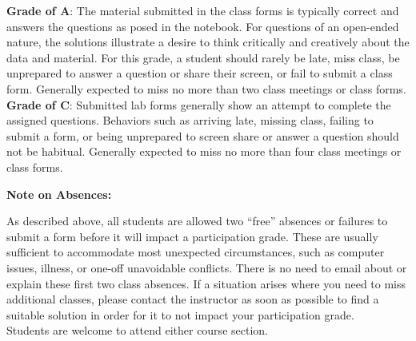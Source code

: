 \documentclass[12pt, a4paper]{article}
\makeatletter
\newcommand{\magenta}[1]{\textcolor{solarized@magenta}{#1}}
\makeatother
\begin{document}
\setlength{\leftskip}{1cm}

\textbf{Grade of \magenta{A}}: The material submitted in the class forms
is typically correct and answers the questions as posed in the notebook. For
questions of an open-ended nature, the solutions illustrate a desire to think
critically and creatively about the data and material. For this grade, a student
should rarely be late, miss class, be unprepared
to answer a question or share their screen, or fail to submit a class form.
Generally expected to miss no more than two class meetings or class forms.
\\

\textbf{Grade of \magenta{C}}: Submitted lab forms generally show an attempt to
complete the assigned questions. Behaviors such as arriving late, missing class,
failing to submit a form, or being unprepared to screen share or answer a
question should not be habitual. Generally expected to miss no more than four
class meetings or class forms.

\setlength{\leftskip}{0pt}

\bigskip

\textbf{Note on Absences:} \vspace{6pt}

As described above, all students are allowed two ``free'' absences or failures
to submit a form before it will impact a participation grade. These are usually
sufficient to accommodate most unexpected circumstances, such as computer issues,
illness, or one-off unavoidable conflicts. There is no need to email about or
explain these first two class absences. If a situation arises where you need to
miss additional classes, please contact the instructor as soon as possible to
find a suitable solution in order for it to not impact your participation
grade.\\

Students are welcome to attend either course section.
\end{document}
